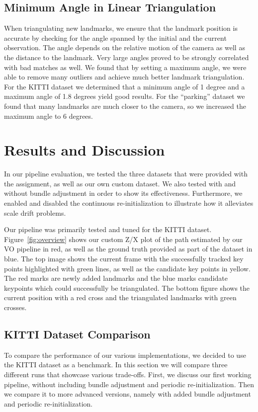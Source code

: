 \documentclass[11pt]{article}
\begin{document}
\subsection{Minimum Angle in Linear Triangulation}
When triangulating new landmarks, we ensure that the landmark position is accurate by checking for the angle spanned by the initial and the current observation. The angle depends on the relative motion of the camera as well as the distance to the landmark.
Very large angles proved to be strongly correlated with bad matches as well. We found that by setting a maximum angle, we were able to remove many outliers and achieve much better landmark triangulation. 
For the KITTI dataset we determined that a minimum angle of 1 degree and a maximum angle of 1.8 degrees yield good results. For the “parking” dataset we found that many landmarks are much closer to the camera, so we increased the maximum angle to 6 degrees.

\section{Results and Discussion}
In our pipeline evaluation, we tested the three datasets that were provided with the assignment, as well as our own custom dataset. We also tested with and without bundle adjustment in order to show its effectiveness. Furthermore, we enabled and disabled the continuous re-initialization to illustrate how it alleviates scale drift problems.

Our pipeline was primarily tested and tuned for the KITTI dataset. Figure~\ref{fig:overview} shows our custom Z/X plot of the path estimated by our VO pipeline in red, as well as the ground truth provided as part of the dataset in blue. The top image shows the current frame with the successfully tracked key points highlighted with green lines, as well as the candidate key points in yellow. The red marks are newly added landmarks and the blue marks candidate keypoints which could successfully be triangulated. The bottom figure shows the current position with a red cross and the triangulated landmarks with green crosses.

\subsection{KITTI Dataset Comparison}
To compare the performance of our various implementations, we decided to use the KITTI dataset as a benchmark. In this section we will compare three different runs that showcase various trade-offs. First, we discuss our first working pipeline, without including bundle adjustment and periodic re-initialization. Then we compare it to more advanced versions, namely with added bundle adjustment and periodic re-initialization.
\end{document}

